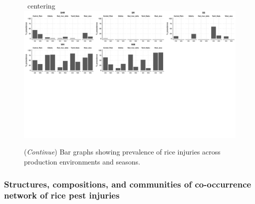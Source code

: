     
    \begin{landscape}
\begin{figure}\
centering
\includegraphics[height = 1\textwidth]{figures/barplot3.pdf}
\caption[\textit{Continue}]{(\textit{Continue}) Bar graphs showing  prevalence of rice injuries across production environments and seasons.} 
\label{fig:barplot3} 
\end{figure}  
\end{landscape} 


\subsubsection{Structures, compositions, and communities of co-occurrence network of rice pest injuries}

